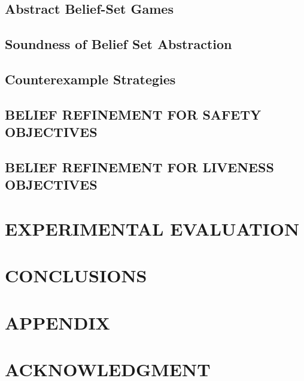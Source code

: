 \documentclass[letterpaper, 10 pt, conference]{ieeeconf}  %
\begin{document}
\subsection{Abstract Belief-Set Games}

\subsection{Soundness of Belief Set Abstraction}

\subsection{Counterexample Strategies}



\subsection{BELIEF REFINEMENT FOR SAFETY OBJECTIVES}



\subsection{BELIEF REFINEMENT FOR LIVENESS OBJECTIVES}



\section{EXPERIMENTAL EVALUATION}



\section{CONCLUSIONS}



\section*{APPENDIX}


\section*{ACKNOWLEDGMENT}




\end{document}

